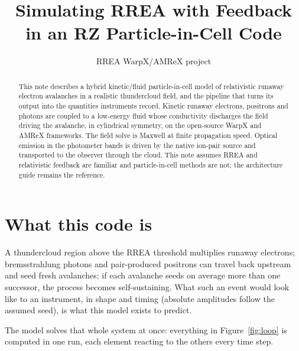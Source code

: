 \documentclass[11pt]{article}
\title{Simulating RREA with Feedback in an RZ Particle-in-Cell Code}
\author{RREA WarpX/AMReX project}
\date{}
\begin{document}
\maketitle

\begin{abstract}
\noindent
This note describes a hybrid kinetic/fluid particle-in-cell model of
relativistic runaway electron avalanches in a realistic thundercloud field, and
the pipeline that turns its output into the quantities instruments record.
Kinetic runaway electrons, positrons and photons are coupled to a low-energy
fluid whose conductivity discharges the field driving the avalanche, in
cylindrical symmetry, on the open-source WarpX and AMReX frameworks. The field
solve is Maxwell at finite propagation speed. Optical emission in the
photometer bands is driven by the native ion-pair source and transported to the
observer through the cloud. This note assumes RREA and relativistic feedback are
familiar and particle-in-cell methods are not; the architecture guide remains
the reference.
\end{abstract}

\section{What this code is}

A thundercloud region above the RREA threshold multiplies runaway electrons;
bremsstrahlung photons and pair-produced positrons can travel back upstream and
seed fresh avalanches; if each avalanche seeds on average more than one
successor, the process becomes self-sustaining. What such an event would look
like to an instrument, in shape and timing (absolute amplitudes follow the
assumed seed), is what this model exists to predict.

The model solves that whole system at once: everything in
Figure~\ref{fig:loop} is computed in one run, each element reacting to the
others every time step.
\end{document}
